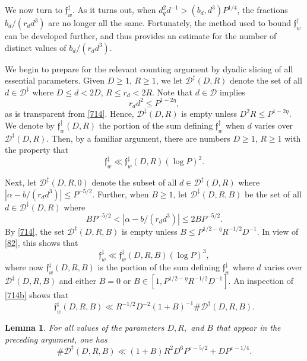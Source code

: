 \documentclass[reqno]{amsart}
\newcommand\eps{\varepsilon}
\newtheorem{lemma}[thm]{Lemma}
\numberwithin{equation}{section}
\begin{document}
We now turn to $\mathfrak f_w^\ddagger$. As it turns out, when $d_q^2 d^{-1} > (b_d,d^3)P^{1/4}$, the fractions $b_d/(r_d d^3)$ are no longer all the same. Fortunately, the method used to bound $\mathfrak f_w^\dagger$ can be developed further, and thus provides an estimate for the number of distinct values of $b_d/(r_d d^3)$.

We begin to prepare for the relevant counting argument by dyadic slicing of all essential parameters. Given $D \ge 1$, $R \ge 1$, we let $\mathscr{D}^\ddagger(D,R)$ denote the set of all $d \in \mathscr{D}^\ddagger$ where $D \leq d < 2D$, $R \leq r_d < 2R$. Note that $d \in \mathscr{D}$ implies
$$ r_dd^2 \leq P^{1 - 2\eta},$$
as is transparent from \eqref{714}. Hence, $\mathscr{D}^\ddagger(D,R)$ is empty unless $D^2 R \leq P^{1 - 2\eta}$. We denote by $\mathfrak f_w^\ddagger(D,R)$ the portion of the sum defining $\mathfrak f_w^\ddagger$ when $d$ varies over $\mathscr{D}^\ddagger(D,R)$. Then, by a familiar argument, there are numbers $D \geq 1$, $R\geq 1$ with the property that
\begin{equation}\label{82}\mathfrak f_w^\ddagger \ll \mathfrak f_w^\ddagger(D, R) (\log P)^2.\end{equation}

Next, let $\mathscr{D}^\ddagger(D,R,0)$ denote the subset of all $d \in \mathscr{D}^\ddagger(D,R)$ where $|\alpha - b/(r_d d^3)| \leq P^{-5/2}$. Further, when $B \geq 1$, let $\mathscr{D}^\ddagger(D,R,B)$ be the set of all $d \in \mathscr{D}^\ddagger(D,R)$ where
\begin{equation}\label{82a}B P^{-5/2} < |\alpha - b/(r_d d^3)| \leq 2B P^{-5/2}.\end{equation}
By \eqref{714}, the set $\mathscr{D}^\ddagger(D,R,B)$ is empty unless $B \le P^{1/2 - \eta} R^{-1/2}{D}^{-1}$. In view of \eqref{82}, this shows that
\begin{equation}\label{83}\mathfrak f_w^\ddagger \ll \mathfrak f_w^\ddagger(D,R,B) (\log P)^3,\end{equation}
where now $\mathfrak f_w^\ddagger(D,R,B)$ is the portion of the sum defining $\mathfrak f_w^\ddagger$ where $d$ varies over $\mathscr{D}^\ddagger(D,R,B)$ and either $B = 0$ or $B \in [1, P^{1/2 - \eta} R^{-1/2} D^{-1}]$. 
An inspection of \eqref{714b} shows that
\begin{equation}\label{84}\mathfrak f_w^\ddagger(D,R,B) \ll R^{-1/2} D^{-2} (1 + B)^{-1} \# \mathscr{D}^\ddagger(D,R,B).\end{equation}
\begin{lemma}\label{L82}
For all values of the parameters $D, R,$ and $B$ that appear in the preceding argument, one has
$$\# \mathscr{D}^\ddagger(D,R,B) \ll (1 + B) R^2 D^6P^{\eps - 5/2} + D P^{\eps - 1/4}.
$$
\end{lemma}
\end{document}
